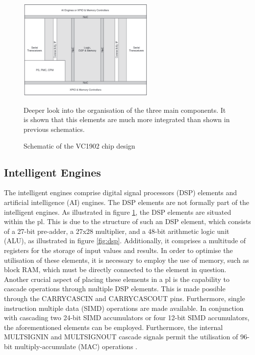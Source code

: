 \begin{figure}[h]
    \centering
    \includegraphics[width=0.6\textwidth]{images/low_level_vc1902.png}
    \captionsetup{justification=centering}
    \caption{Schematic of the VC1902 chip design \cite{AMD_a_aie}}
            Deeper look into the organisation of the three main components. It is shown that this elements are much more integrated than shown in previous schematics. 
    \label{fig:low_scheme}
\end{figure}

\subsection{Intelligent Engines}
The intelligent engines comprise digital signal processors (DSP) elements and artificial intelligence 
(AI) engines. The DSP elements are not formally part of the intelligent engines. As illustrated in 
figure \ref{fig:low_scheme}, the DSP elements are situated within the \ac{pl}. This is due 
to the structure of such an DSP element, which consists of a 27-bit pre-adder, a 27x28 multiplier, and 
a 48-bit arithmetic logic unit (ALU), as illustrated in figure \ref{fig:dsp}. Additionally, it 
comprises a multitude of registers for the storage of input values and results. In order to optimise 
the utilisation of these elements, it is necessary to employ the use of memory, such as block RAM, 
which must be directly connected to the element in question. Another crucial aspect of placing these 
elements in a \ac{pl} is the capability to cascade operations through multiple DSP elements. 
This is made possible through the CARRYCASCIN and CARRYCASCOUT pins. Furthermore, single instruction 
multiple data (SIMD) operations are made available. In conjunction with cascading two 24-bit SIMD 
accumulators or four 12-bit SIMD accumulators, the aforementioned elements can be employed. 
Furthermore, the internal MULTSIGNIN and MULTSIGNOUT cascade signals permit the utilisation of 96-bit 
multiply-accumulate (MAC) operations \cite{AMD_a_aie}.\par

